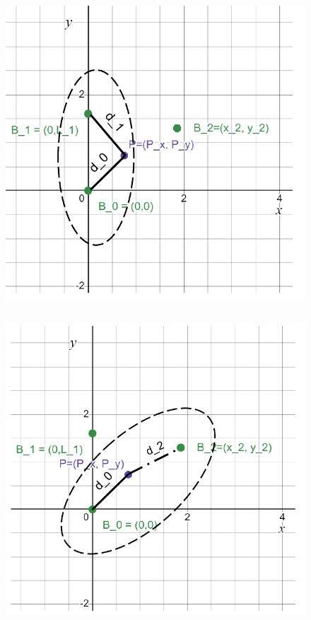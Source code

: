 \documentclass[a4paper,12pt]{article}
\begin{document}
\begin{figure}[!ht]
    \centering
    \begin{minipage}{.5\textwidth}
      \centering
      \includegraphics[width=\linewidth]{draw3.1.pdf}
~\label{fig:draw3_1}
    \end{minipage}%
    \begin{minipage}{.5\textwidth}
      \centering
      \includegraphics[width=\linewidth]{draw3.2.pdf}
~\label{fig:draw3_2}
    \end{minipage}
\end{figure} 
\end{document}

